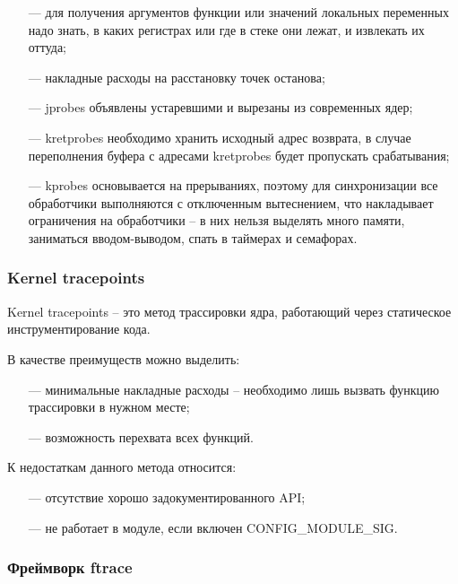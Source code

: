\begin{itemize}[leftmargin=0.7cm +  - ]
	\item[---] для получения аргументов функции или значений локальных переменных надо знать, в каких регистрах или где в стеке они лежат, и извлекать их оттуда;
	\item[---] накладные расходы на расстановку точек останова;
	\item[---] jprobes объявлены устаревшими и вырезаны из современных ядер;
	\item[---] kretprobes необходимо хранить исходный адрес возврата, в случае переполнения буфера с адресами kretprobes будет пропускать срабатывания;
	\item[---] kprobes основывается на прерываниях, поэтому для синхронизации все обработчики выполняются с отключенным вытеснением, что накладывает ограничения на обработчики -- в них нельзя выделять много памяти, заниматься вводом-выводом, спать в таймерах и семафорах.
\end{itemize}

\subsubsection{Kernel tracepoints}

Kernel tracepoints -- это метод трассировки ядра, работающий через статическое инструментирование кода.

В качестве преимуществ можно выделить:

\begin{itemize}[leftmargin=0.7cm +  - ]
	\item[---] минимальные накладные расходы -- необходимо лишь вызвать функцию трассировки в нужном месте;
	\item[---] возможность перехвата всех функций.
\end{itemize}

К недостаткам данного метода относится:

\begin{itemize}[leftmargin=0.7cm +  - ]
	\item[---] отсутствие хорошо задокументированного API;
	\item[---] не работает в модуле, если включен CONFIG\_MODULE\_SIG.
\end{itemize}

\subsubsection{Фреймворк ftrace}


